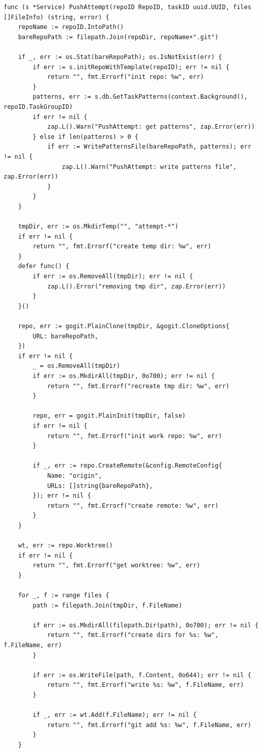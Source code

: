 \documentclass[coursework]{SCWorks}
\begin{document}
\begin{verbatim}
func (s *Service) PushAttempt(repoID RepoID, taskID uuid.UUID, files []FileInfo) (string, error) {
	repoName := repoID.IntoPath()
	bareRepoPath := filepath.Join(repoDir, repoName+".git")

	if _, err := os.Stat(bareRepoPath); os.IsNotExist(err) {
		if err := s.initRepoWithTemplate(repoID); err != nil {
			return "", fmt.Errorf("init repo: %w", err)
		}
		patterns, err := s.db.GetTaskPatterns(context.Background(), repoID.TaskGroupID)
		if err != nil {
			zap.L().Warn("PushAttempt: get patterns", zap.Error(err))
		} else if len(patterns) > 0 {
			if err := WritePatternsFile(bareRepoPath, patterns); err != nil {
				zap.L().Warn("PushAttempt: write patterns file", zap.Error(err))
			}
		}
	}

	tmpDir, err := os.MkdirTemp("", "attempt-*")
	if err != nil {
		return "", fmt.Errorf("create temp dir: %w", err)
	}
	defer func() {
		if err := os.RemoveAll(tmpDir); err != nil {
			zap.L().Error("removing tmp dir", zap.Error(err))
		}
	}()

	repo, err := gogit.PlainClone(tmpDir, &gogit.CloneOptions{
		URL: bareRepoPath,
	})
	if err != nil {
		_ = os.RemoveAll(tmpDir)
		if err := os.MkdirAll(tmpDir, 0o700); err != nil {
			return "", fmt.Errorf("recreate tmp dir: %w", err)
		}

		repo, err = gogit.PlainInit(tmpDir, false)
		if err != nil {
			return "", fmt.Errorf("init work repo: %w", err)
		}

		if _, err := repo.CreateRemote(&config.RemoteConfig{
			Name: "origin",
			URLs: []string{bareRepoPath},
		}); err != nil {
			return "", fmt.Errorf("create remote: %w", err)
		}
	}

	wt, err := repo.Worktree()
	if err != nil {
		return "", fmt.Errorf("get worktree: %w", err)
	}

	for _, f := range files {
		path := filepath.Join(tmpDir, f.FileName)

		if err := os.MkdirAll(filepath.Dir(path), 0o700); err != nil {
			return "", fmt.Errorf("create dirs for %s: %w", f.FileName, err)
		}

		if err := os.WriteFile(path, f.Content, 0o644); err != nil {
			return "", fmt.Errorf("write %s: %w", f.FileName, err)
		}

		if _, err := wt.Add(f.FileName); err != nil {
			return "", fmt.Errorf("git add %s: %w", f.FileName, err)
		}
	}


\end{verbatim}
\end{document}
